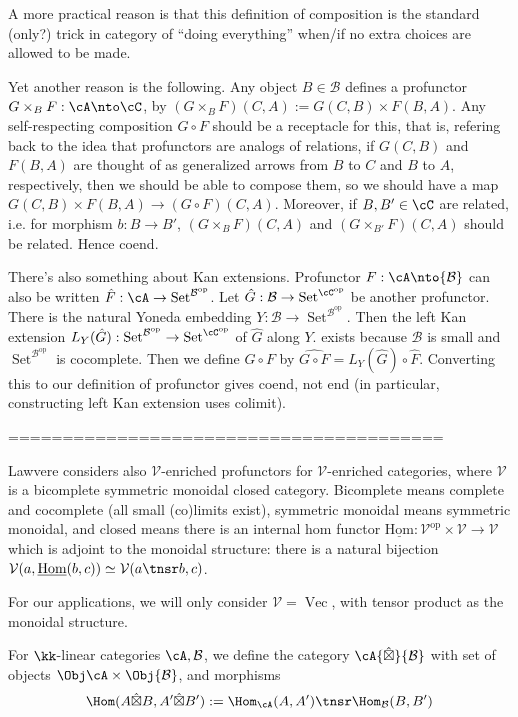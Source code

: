 \documentclass[12pt]{article}
\newcommand{\op}{{\text{op}}}
\newcommand{\cB}{{\mathcal{B}}}
\newcommand{\cV}{{\mathcal{V}}}
\newcommand{\hatbox}{{\hat{\boxtimes}}}
\DeclareMathOperator{\Set}{Set}
\DeclareMathOperator{\Vect}{Vec}
\newcommand{\ihom}{{\underline{\textrm{Hom}}}}
\begin{document}
A more practical reason is that
this definition of composition is the standard (only?) trick
in category of ``doing everything''
when/if no extra choices are allowed to be made.

Yet another reason is the following.
Any object $B \in \cB$ defines a profunctor
$G \times_B F : \cA \nto \cC$,
by $(G \times_B F)(C,A) := G(C,B) \times F(B,A)$.
Any self-respecting composition $G \circ F$
should be a receptacle for this,
that is, refering back to the idea that profunctors are
analogs of relations,
if $G(C,B)$ and $F(B,A)$ are thought of as generalized arrows
from $B$ to $C$ and $B$ to $A$, respectively,
then we should be able to compose them,
so we should have a map
$G(C,B) \times F(B,A) \to (G\circ F)(C,A)$.
Moreover, if $B,B' \in \cC$ are related,
i.e. for morphism $b: B \to B'$,
$(G \times_B F)(C,A)$ and $(G \times_{B'} F)(C,A)$
should be related.
Hence coend.

There's also something about Kan extensions.
Profunctor $F: \cA \nto \cB$ can also be written
$\hat{F}: \cA \to \Set^{\cB^\op}$.
Let $\hat{G}: \cB \to \Set^{\cC^\op}$ be another profunctor.
There is the natural Yoneda embedding $Y:\cB \to \Set^{\cB^\op}$.
Then the left Kan extension
$L_{Y}(\hat{G}): \Set^{\cB^\op} \to \Set^{\cC^\op}$
of $\hat{G}$ along $Y$.
exists because $\cB$ is small and $\Set^{\cB^\op}$
is cocomplete.
Then we define $G\circ F$ by
$\widehat{G\circ F} = L_{Y}(\hat{G}) \circ \hat{F}$.
Converting this to our definition of profunctor
gives coend, not end
(in particular, constructing left Kan extension uses colimit).



========================================

Lawvere considers also $\cV$-enriched profunctors
for $\cV$-enriched categories,
where $\cV$ is a
bicomplete symmetric monoidal closed category.
Bicomplete means complete and cocomplete
(all small (co)limits exist),
symmetric monoidal means symmetric monoidal,
and closed means there is an internal hom functor
$\ihom: \cV^\op \times \cV \to \cV$
which is adjoint to the monoidal structure:
there is a natural bijection
$\cV(a,\ihom(b,c)) \simeq \cV(a \tnsr b, c)$.

For our applications, we will only consider $\cV = \Vect$,
with tensor product as the monoidal structure.

\begin{definition}
\label{d:hatbox}
For $\kk$-linear categories $\cA,\cB$,
we define the category $\cA \hatbox \cB$
with set of objects $\Obj \cA \times \Obj \cB$,
and morphisms
\[
\Hom(A \hatbox B, A' \hatbox B')
:=
\Hom_\cA(A, A') \tnsr \Hom_\cB(B, B')
\]
\end{definition}
\end{document}
